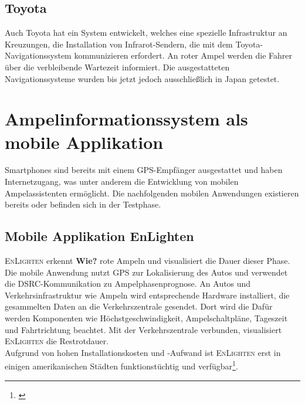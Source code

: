 \subsection*{Toyota}
Auch Toyota hat ein System entwickelt, welches eine spezielle Infrastruktur an Kreuzungen, die Installation von Infrarot-Sendern, die mit dem Toyota-Navigationssystem kommunizieren erfordert. An roter Ampel werden die Fahrer über die verbleibende Wartezeit informiert. Die ausgestatteten Navigationssysteme wurden bis jetzt jedoch ausschließlich in Japan getestet. \cite{Toyota}
%
%
\clearpage
\section{Ampelinformationssystem als mobile Applikation}
\glspl{Smartphone} sind bereits mit einem \gls{GPS}-Empfänger ausgestattet und haben Internetzugang, was unter anderem die Entwicklung von mobilen Ampelassistenten ermöglicht. Die nachfolgenden mobilen Anwendungen existieren bereits oder befinden sich in der Testphase.
\subsection*{Mobile Applikation EnLighten}
\textsc{EnLighten} erkennt \textbf{Wie?} rote Ampeln und visualisiert die Dauer dieser Phase. Die mobile Anwendung nutzt \gls{GPS} zur Lokalisierung des Autos und verwendet die \gls{DSRC}-Kommunikation zu Ampelphasenprognose. 
An Autos und Verkehrsinfrastruktur wie Ampeln wird entsprechende Hardware installiert, die gesammelten Daten an die Verkehrszentrale gesendet. Dort wird die  
Dafür werden Komponenten wie Höchstgeschwindigkeit, Ampelschaltpläne, Tageszeit und Fahrtrichtung beachtet. Mit der Verkehrszentrale verbunden, visualisiert \textsc{EnLighten} die Restrotdauer.\\ Aufgrund von hohen Installationskosten und -Aufwand ist \textsc{EnLighten} erst in einigen amerikanischen Städten funktionstüchtig und verfügbar\footnote{\cite{EnLighten}}.
